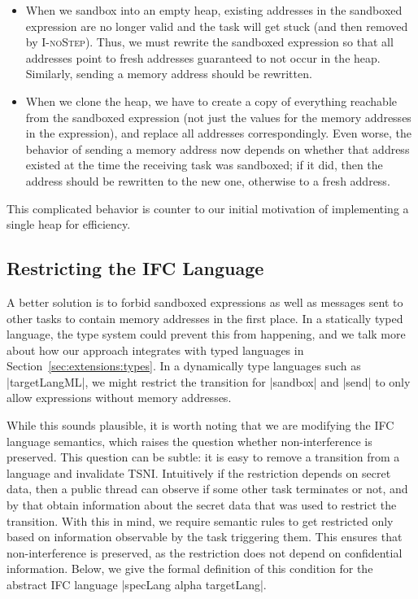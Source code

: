 \begin{itemize}
    \item When we sandbox into an empty heap, existing addresses
in the sandboxed expression are no longer valid and the
task will get stuck (and then removed by \textsc{I-noStep}).
Thus, we must rewrite the sandboxed expression so that
all addresses point to fresh addresses
guaranteed to not occur in the heap.  Similarly,
sending a memory address should be rewritten.

\item When we clone the heap, we have to create a copy of everything
reachable from the sandboxed expression (not just the values for
the memory addresses in the expression), and replace all addresses
correspondingly.  Even worse, the behavior of sending a memory address
now depends on whether that address existed at the time the receiving
task was sandboxed;  if it did, then the address should be rewritten to the
new one, otherwise to a fresh address.
\end{itemize}

This complicated behavior is counter to our initial motivation
of implementing a single heap for efficiency.



\subsection{Restricting the IFC Language}

A better solution is to forbid sandboxed expressions as well
as messages sent to other tasks to contain memory addresses in the
first place.  In a statically typed language, the type system could
prevent this from happening, and we talk more about how our
approach integrates with typed languages in
Section~\ref{sec:extensions:types}.
In a dynamically type languages such as |targetLangML|, we might
restrict the transition for |sandbox| and |send| to only allow expressions
without memory addresses.

While this sounds plausible, it is worth noting that we are modifying the IFC language semantics,
which raises the question whether non-interference is preserved.
This question can be subtle: it is easy to remove a transition from
a language and invalidate TSNI.  Intuitively
if the restriction depends on secret data, then a public thread
can observe if some other task terminates or not, and by that obtain
information about the secret data that was used to restrict the
transition.
With this in mind, we require semantic rules to get restricted only
based on information observable by the task triggering them.
This ensures that non-interference is preserved, as the
restriction does not depend on confidential information.
Below, we give the formal definition of this condition for the
abstract IFC language |specLang alpha targetLang|.

